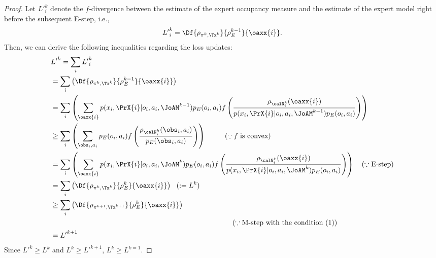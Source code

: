 \begin{proof}
    Let ${L'}_i^k$ denote the $f$-divergence between the estimate of the expert occupancy measure and the estimate of the expert model right before the subsequent E-step, i.e.,
    \begin{align*}
        {L'}_i^k = \Df{\rho_{\pi^k,\Tx^k}}{\rho_{E}^{k-1}}{\oaxx{i}} .
    \end{align*}
    Then, we can derive the following inequalities regarding the loss updates:
    \begin{align*}
         &{L'}^k = \sum_i  {L'}_i^k \\
         &=\sum_i \left(\Df{\rho_{\pi^k,\Tx^k}}{\rho_{E}^{k-1}}{\oaxx{i}}\right)\\
         &=\sum_i \left( 
            \sum_{\oaxx{i}} p(x_i, \PrX{i}|o_i, a_i, \JoAM^{k-1})p_E(o_i, a_i) f \left( \frac{\rho_{\calN_i^k}(\oaxx{i})}{p(x_i, \PrX{i}|o_i, a_i, \JoAM^{k-1})p_E(o_i, a_i)} \right) \right) \\
         &\geq \sum_i \left( 
            \sum_{\obs_i, a_i} p_E(o_i, a_i) f \left( \frac{\rho_{\calN_i^k}(\obs_i, a_i)}{p_E(\obs_i, a_i)} \right)   \right)~\qquad ~(\because \text{\textit{f} is convex})\\
        &=\sum_i \left( 
            \sum_{\oaxx{i}} p(x_i, \PrX{i}|o_i, a_i, \JoAM^{k})p_E(o_i, a_i) f \left( \frac{\rho_{\calN_i^k}(\oaxx{i})}{p(x_i, \PrX{i}|o_i, a_i, \JoAM^{k})p_E(o_i, a_i)} \right)  \right)\quad (\because \text{E-step})\\
         &=\sum_i \left(\Df{\rho_{\pi^k,\Tx^k}}{\rho_{E}^{k}}{\oaxx{i}} \right)~~ (:= L^k)\\
         &\geq \sum_i \left(\Df{\rho_{\pi^{k+1},\Tx^{k+1}}}{\rho_{E}^{k}}{\oaxx{i}}\right) \\
         &\hspace{9cm}(\because \text{M-step with the condition (1)}) \\
         &={L'}^{k+1}
    \end{align*}
    Since ${L'}^k \geq {L}^k$ and ${L}^k \geq {L'}^{k+1}$, $L^{k} \geq L^{k=1}$.
\end{proof}




